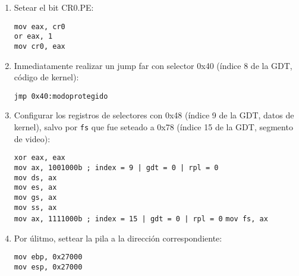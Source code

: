 	\begin{enumerate}
		\item Setear el bit CR0.PE:

		\texttt{mov eax, cr0}\\
		\texttt{or eax, 1}\\
		\texttt{mov cr0, eax}

		\item Inmediatamente realizar un jump far con selector 0x40 (índice 8 de la GDT, código de kernel):
    
		\texttt{jmp 0x40:modoprotegido}
		
		\item Configurar los registros de selectores con 0x48 (índice 9 de la GDT, datos de kernel), salvo por \texttt{fs} que fue seteado a 0x78 (índice 15 de la GDT, segmento de video):

		\texttt{xor eax, eax}\\
		\texttt{mov ax, 1001000b ; index = 9 | gdt = 0 | rpl = 0}\\
		\texttt{mov ds, ax}\\
		\texttt{mov es, ax}\\
		\texttt{mov gs, ax}\\
		\texttt{mov ss, ax}\\
		\texttt{mov ax, 1111000b ; index = 15 | gdt = 0 | rpl = 0}
		\texttt{mov fs, ax}

		\item Por úlitmo, settear la pila a la dirección correspondiente:

		\texttt{mov ebp, 0x27000}\\
		\texttt{mov esp, 0x27000}

	\end{enumerate}